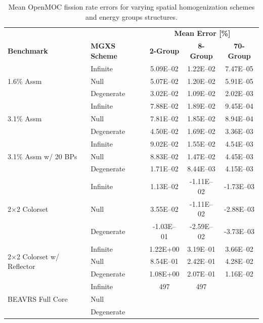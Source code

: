 \begin{table}[h!]
  \centering
  \caption[Mean OpenMOC fission rate errors]{Mean OpenMOC fission rate errors for varying spatial homogenization schemes and energy groups structures.}
  \small
  \label{table:chap8-openmoc-mean-fiss-rates}
  \vspace{6pt}
  \begin{tabular}{l l c c c}
  \toprule
  \rowcolor{lightgray}
  & & \multicolumn{3}{c}{\cellcolor{lightgray} \textbf{Mean Error [\%]}} \\
  \multirow{-2}{*}{\cellcolor{lightgray} \bf Benchmark} &
  \multirow{-2}{*}{\cellcolor{lightgray} \bf \ac{MGXS} Scheme} &
  {\cellcolor{lightgray} \bf 2-Group} &
  {\cellcolor{lightgray} \bf 8-Group} &
  {\cellcolor{lightgray} \bf 70-Group} \\
  \midrule
\multirow{3}{*}{\parbox{2.5cm}{1.6\% Assm}} & Infinite & 5.09E--02 & 1.22E--02 & 7.47E--05 \\
& Null & 5.07E--02 & 1.20E--02 & 5.91E--05 \\
& Degenerate & 3.02E--02 & 1.09E--02 & 2.02E--03 \\
  \midrule
\multirow{3}{*}{\parbox{2.5cm}{3.1\% Assm}} & Infinite & 7.88E--02 & 1.89E--02 & 9.45E--04 \\
& Null & 7.81E--02 & 1.85E--02 & 8.94E--04 \\
& Degenerate & 4.50E--02 & 1.69E--02 & 3.36E--03 \\
  \midrule
\multirow{3}{*}{\parbox{2.5cm}{3.1\% Assm w/ 20 BPs}} & Infinite & 9.02E--02 & 1.55E--02 & 4.54E--03 \\
& Null & 8.83E--02 & 1.47E--02 & 4.45E--03 \\
& Degenerate & 1.71E--02 & 8.44E--03 & 4.15E--03 \\
  \midrule
\multirow{3}{*}{\parbox{2.5cm}{2$\times$2 Colorset}} & Infinite & 1.13E--02 & -1.11E--02 & -1.73E--03 \\
& Null & 3.55E--02 & -1.11E--02 & -2.88E--03 \\
& Degenerate & -1.03E--01 & -2.59E--02 & -3.73E--03 \\
  \midrule
\multirow{3}{*}{\parbox{2.5cm}{2$\times$2 Colorset w/ Reflector}} & Infinite & 1.22E+00 & 3.19E--01 & 3.66E--02 \\
& Null & 8.54E--01 & 2.42E--01 & 4.28E--02 \\
& Degenerate & 1.08E+00 & 2.07E--01 & 1.16E--02 \\
  \midrule
  \multirow{3}{*}{\parbox{2cm}{\ac{BEAVRS} Full Core}} & Infinite & 497 & 497 & \\
  & Null & & & \\
  & Degenerate & & & \\
  \bottomrule
\end{tabular}
\end{table}


